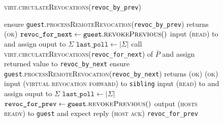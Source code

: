 \begin{figure}[H]
  \begin{processbox}{\textsc{virt.circulateRevocations}(\texttt{revoc\_by\_prev})}
    \begin{algorithmic}[1]
     
      \State ensure
      \texttt{guest}.\textsc{processRemoteRevocation}(\texttt{revoc\_by\_prev})
      returns (\textsc{ok})
      \label{code:virtual-layer:revocation:non-funder:proc-remote}
    \Else \: 
      \State $\texttt{revoc\_for\_next} \gets
      \texttt{guest}.\textsc{revokePrevious}()$
      \State input (\textsc{read}) to \ledger and assign ouput to $\Sigma$
      \State $\texttt{last\_poll} \gets |\Sigma|$
      \State call \textsc{virt.circulateRevocations}(\texttt{revoc\_for\_next})
      of $\bar{P}$ and assign returned value to \texttt{revoc\_by\_next}
      \label{code:virtual-layer:revocation:revoc-by-next}
      \State ensure
      \texttt{guest}.\textsc{processRemoteRevocation}(\texttt{revoc\_by\_next})
      returns (\textsc{ok}) 
      \label{code:virtual-layer:revocation:funder:proc-remote}
      \State \Return (\textsc{ok})
    \EndIf
     
      \State input (\textsc{virtual revocation forward}) to \texttt{sibling}
      \State {}
      \State input (\textsc{read}) to \ledger and assign ouput to $\Sigma$
      \State $\texttt{last\_poll} \gets |\Sigma|$
      \State {}
      \State {}
      \State {}
    \EndIf
    \State $\texttt{revoc\_for\_prev} \gets
    \texttt{guest}.\textsc{revokePrevious}()$
    \State output (\textsc{hosts ready}) to \texttt{guest} and expect reply
    (\textsc{host ack})
    \label{code:virtual-layer:revocation:hosts-ready}
    \State \Return \texttt{revoc\_for\_prev} 
    \end{algorithmic}
  \end{processbox}
  \caption{}
  \label{code:virtual-layer:revocation}
\end{figure}

